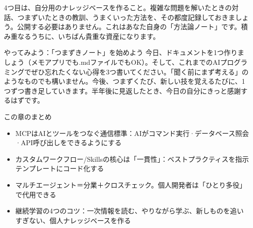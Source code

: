 4つ目は、自分用のナレッジベースを作ること。複雑な問題を解いたときの対話、つまずいたときの教訓、うまくいった方法を、その都度記録しておきましょう。公開する必要はありません。これはあなた自身の「方法論ノート」です。積み重なるうちに、いちばん貴重な資産になります。

\begin{tcbpractice}{やってみよう：「つまずきノート」を始めよう}
今日、ドキュメントを1つ作りましょう（メモアプリでも.mdファイルでもOK）。そして、これまでのAIプログラミングでぜひ忘れたくない心得を3つ書いてください。「聞く前にまず考える」のようなものでも構いません。今後、つまずくたび、新しい技を覚えるたびに、1つずつ書き足していきます。半年後に見返したとき、今日の自分にきっと感謝するはずです。

\end{tcbpractice}

\begin{tcbsummary}{この章のまとめ}
\begin{itemize}
  \item MCPはAIとツールをつなぐ通信標準：AIがコマンド実行·データベース照会·API呼び出しをできるようにする
  \item カスタムワークフロー/Skillsの核心は「一貫性」：ベストプラクティスを指示テンプレートにコード化する
  \item マルチエージェント＝分業＋クロスチェック。個人開発者は「ひとり多役」で代用できる
  \item 継続学習の4つのコツ：一次情報を読む、やりながら学ぶ、新しものを追いすぎない、個人ナレッジベースを作る
\end{itemize}

\end{tcbsummary}
